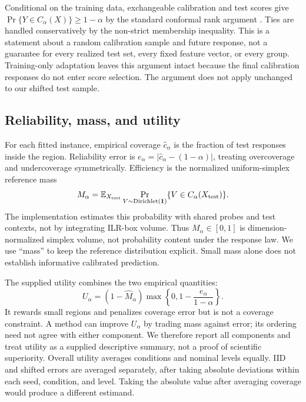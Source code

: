 \documentclass{article}
\begin{document}
Conditional on the training data, exchangeable calibration and test scores give $\Pr\{Y\in C_\alpha(X)\}\geq1-\alpha$ by the standard conformal rank argument \citep{Lei2018}. Ties are handled conservatively by the non-strict membership inequality. This is a statement about a random calibration sample and future response, not a guarantee for every realized test set, every fixed feature vector, or every group. Training-only adaptation leaves this argument intact because the final calibration responses do not enter score selection. The argument does not apply unchanged to our shifted test sample.

\subsection{Reliability, mass, and utility}
For each fitted instance, empirical coverage $\widehat c_\alpha$ is the fraction of test responses inside the region. Reliability error is $e_\alpha=|\widehat c_\alpha-(1-\alpha)|$, treating overcoverage and undercoverage symmetrically. Efficiency is the normalized uniform-simplex reference mass
\begin{equation}
 M_\alpha=\mathbb E_{X_{\rm test}}\Pr_{V\sim\operatorname{Dirichlet}(\mathbf1)}
 \{V\in C_\alpha(X_{\rm test})\}.
 \label{eq:mass}
\end{equation}
The implementation estimates this probability with shared probes and test contexts, not by integrating ILR-box volume. Thus $M_\alpha\in[0,1]$ is dimension-normalized simplex volume, not probability content under the response law. We use ``mass'' to keep the reference distribution explicit. Small mass alone does not establish informative calibrated prediction. %

The supplied utility combines the two empirical quantities:
\begin{equation}
 U_\alpha=(1-\widehat M_\alpha)
 \max\left\{0,1-\frac{e_\alpha}{1-\alpha}\right\}.
 \label{eq:utility}
\end{equation}
It rewards small regions and penalizes coverage error but is not a coverage constraint. A method can improve $U_\alpha$ by trading mass against error; its ordering need not agree with either component. We therefore report all components and treat utility as a supplied descriptive summary, not a proof of scientific superiority. Overall utility averages conditions and nominal levels equally. IID and shifted errors are averaged separately, after taking absolute deviations within each seed, condition, and level. Taking the absolute value after averaging coverage would produce a different estimand. %
\end{document}

